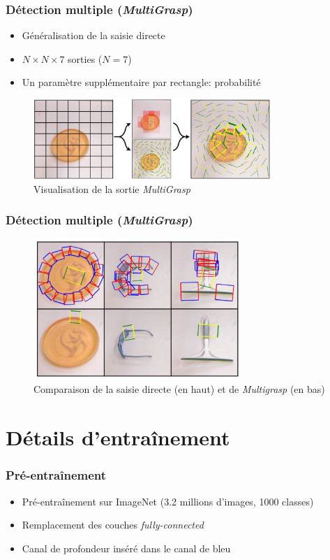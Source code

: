 \documentclass{beamer}
\begin{document}
\begin{frame}
  \frametitle{Détection multiple (\emph{MultiGrasp})}
  \begin{itemize}
  \item Généralisation de la saisie directe
  \item $N \times N \times 7$ sorties ($N = 7$)
  \item Un paramètre supplémentaire par rectangle: probabilité
  \end{itemize}
  \begin{figure}
    \centering
    \includegraphics[width=0.8\textwidth]{img/multigrasp.png}
    \caption{Visualisation de la sortie \emph{MultiGrasp}}
    \label{fig:multigrasp}
  \end{figure}
\end{frame}

\begin{frame}
  \frametitle{Détection multiple (\emph{MultiGrasp})}
  \begin{figure}
    \centering
    \includegraphics[width=0.7\textwidth]{img/direct_vs_multi.png}
    \caption{Comparaison de la saisie directe (en haut) et de \emph{Multigrasp}
      (en bas)}
    \label{fig:multigrasp_comp}
  \end{figure}
\end{frame}

\section{Détails d'entraînement}
\begin{frame}
  \frametitle{Pré-entraînement}
  \begin{itemize}
  \item Pré-entraînement sur ImageNet (3.2 millions d'images, 1000 classes)
  \item Remplacement des couches \emph{fully-connected}
  \item Canal de profondeur inséré dans le canal de bleu
  \end{itemize}
  
\end{frame}
\end{document}
